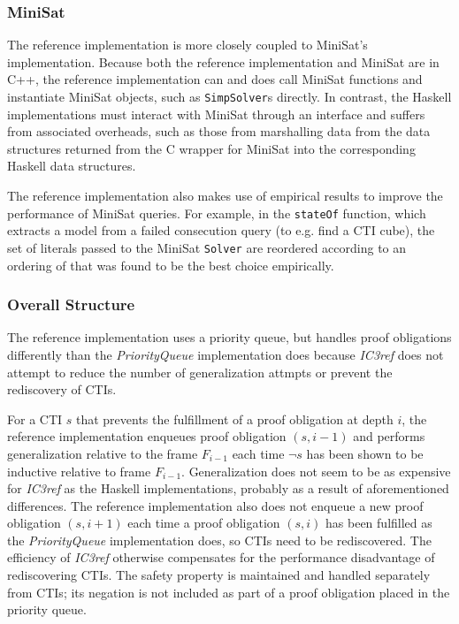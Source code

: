 \documentclass[12pt,a4paper,twoside,openright]{report}
\begin{document}
{\subsubsection{MiniSat}
The reference implementation is more closely coupled to MiniSat's implementation. Because both the reference
implementation and MiniSat are in C++, the reference implementation can and does call MiniSat functions
and instantiate MiniSat objects, such as \verb,SimpSolver,s directly.
In contrast, the Haskell implementations
must interact with MiniSat through an interface and suffers from associated overheads, such as those from
marshalling data from the data structures returned from the C wrapper for MiniSat into the corresponding
Haskell data structures.

The reference implementation also makes use of empirical results to improve the performance of MiniSat queries.
For example, in the \verb,stateOf, function, which extracts a model from a failed consecution query
(to e.g. find a CTI cube), the set of literals passed to the MiniSat \verb,Solver, are reordered according
to an ordering of that was found to be the best choice empirically.

\subsubsection{Overall Structure}

The reference implementation uses a priority queue, but handles proof obligations
differently than the {\it PriorityQueue} implementation does because \emph{IC3ref}
does not attempt to reduce the number of generalization attmpts or prevent
the rediscovery of CTIs.

For a CTI $s$ that prevents the fulfillment
of a proof obligation at depth $i$, the reference implementation enqueues proof
obligation $(s,i - 1)$
and performs generalization relative to the frame $F_{i - 1}$ each time $\neg s$ has been shown
to be inductive relative to frame $F_{i - 1}$. Generalization does not seem
to be as expensive for \emph{IC3ref} as the Haskell implementations, probably as a
result of aforementioned differences.
The reference implementation also does not
enqueue a new proof obligation $(s, i+1)$ each time a proof obligation $(s, i)$ has been
fulfilled as the \emph{PriorityQueue} implementation does,
so CTIs need to be rediscovered. The efficiency of \emph{IC3ref} otherwise compensates
for the performance disadvantage of rediscovering CTIs.
The safety property is maintained and
handled separately from CTIs; its negation is not included as part of a proof obligation
placed in the priority queue.

}
\end{document}
